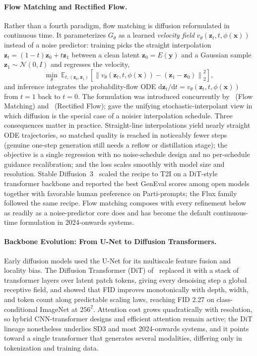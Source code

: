\paragraph{Flow Matching and Rectified Flow.}\label{para:p3_s8_1_1_fm}
Rather than a fourth paradigm, flow matching is diffusion reformulated in continuous time.
It parameterizes $G_\theta$ as a learned \emph{velocity field} $v_\theta(\mathbf{z}_t,t,\phi(\mathbf{x}))$ instead of a noise predictor: training picks the straight interpolation $\mathbf{z}_t=(1-t)\mathbf{z}_0+t\mathbf{z}_1$ between a clean latent $\mathbf{z}_0=E(\mathbf{y})$ and a Gaussian sample $\mathbf{z}_1\!\sim\!\mathcal{N}(0,I)$ and regresses the velocity,
\begin{equation}
\min_\theta\ \mathbb{E}_{t,(\mathbf{z}_0,\mathbf{z}_1)}\!\left[\left\|v_\theta(\mathbf{z}_t,t,\phi(\mathbf{x}))-(\mathbf{z}_1-\mathbf{z}_0)\right\|_2^2\right],
\label{eq:t2i_fm_objective}
\end{equation}
and inference integrates the probability-flow ODE $\mathrm{d}\mathbf{z}_t/\mathrm{d}t=v_\theta(\mathbf{z}_t,t,\phi(\mathbf{x}))$ from $t=1$ back to $t=0$.
The formulation was introduced concurrently by~\citet{lipman2023flow} (Flow Matching) and~\citet{liu2023rectifiedflow} (Rectified Flow); \citet{albergo2023building} gave the unifying stochastic-interpolant view in which diffusion is the special case of a noisier interpolation schedule.
Three consequences matter in practice. Straight-line interpolations yield nearly straight ODE trajectories, so matched quality is reached in noticeably fewer steps (genuine one-step generation still needs a reflow or distillation stage); the objective is a single regression with no noise-schedule design and no per-schedule guidance recalibration; and the loss scales smoothly with model size and resolution.
Stable Diffusion~3~\cite{sd3rft2024} scaled the recipe to T2I on a DiT-style transformer backbone and reported the best GenEval scores among open models together with favorable human preference on Parti-prompts; the Flux family followed the same recipe.
Flow matching composes with every refinement below as readily as a noise-predictor core does and has become the default continuous-time formulation in 2024-onwards systems.

\paragraph{Backbone Evolution: From U-Net to Diffusion Transformers.}
Early diffusion models used the U-Net for its multiscale feature fusion and locality bias.
The Diffusion Transformer (DiT) of~\citet{peebles2023dit} replaced it with a stack of transformer layers over latent patch tokens, giving every denoising step a global receptive field, and showed that FID improves monotonically with depth, width, and token count along predictable scaling laws, reaching FID 2.27 on class-conditional ImageNet at $256^2$.
Attention cost grows quadratically with resolution, so hybrid CNN-transformer designs and efficient attention remain active; the DiT lineage nonetheless underlies SD3 and most 2024-onwards systems, and it points toward a single transformer that generates several modalities, differing only in tokenization and training data.

